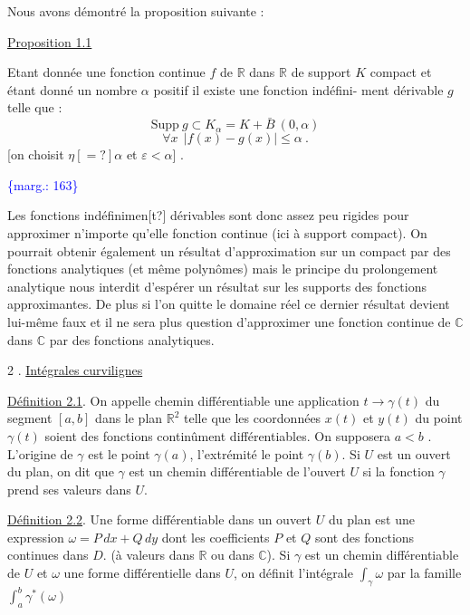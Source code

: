 \documentclass[11pt]{article}
\newcommand{\scanpage}[1]{\par\bigskip\noindent{\small\sffamily[scan #1]}\par}
\newcommand{\mspage}[1]{{\small\sffamily[p.\,#1]}}
\newcommand{\margin}[1]{\textcolor{blue}{\{\textsf{marg.:} #1\}}}
\newcommand{\uline}[1]{\underline{#1}}
\newcommand{\unsure}[1]{[#1?]}
\begin{document}
Nous avons démontré la proposition suivante :

\uline{Proposition 1.1}

Etant donnée une fonction continue $f$ de $\mathbb{R}$ dans $\mathbb{R}$ de support $K$
compact et étant donné un nombre $\alpha$ positif il existe une fonction indéfini-%
ment dérivable $g$ telle que :
\[ \mathrm{Supp}\ g \subset K_\alpha = K + \bar{B}\ (0,\alpha) \]
\[ \forall x\ \ |f(x) - g(x)| \leq \alpha\ . \]
[on choisit $\eta \unsure{=} \alpha$ et $\varepsilon < \alpha$] .

\margin{163}

\clearpage
\scanpage{119/164}
\mspage{- 3 -}

Les fonctions indéfinimen\unsure{t} dérivables sont donc assez peu rigides
pour approximer n'importe qu'elle fonction continue (ici à support compact).
On pourrait obtenir également un résultat d'approximation sur un compact par
des fonctions analytiques (et même polynômes) mais le principe du prolongement
analytique nous interdit d'espérer un résultat sur les supports des fonctions
approximantes.
De plus si l'on quitte le domaine réel ce dernier résultat devient lui-même
faux et il ne sera plus question d'approximer une fonction continue de $\mathbb{C}$
dans $\mathbb{C}$ par des fonctions analytiques.

2 . \uline{Intégrales curvilignes}

\uline{Définition 2.1}. On appelle chemin différentiable une application $t \to \gamma(t)$
du segment $[a,b]$ dans le plan $\mathbb{R}^2$ telle que les coordonnées $x(t)$ et $y(t)$
du point $\gamma(t)$ soient des fonctions continûment différentiables. On supposera
$a < b$ . L'origine de $\gamma$ est le point $\gamma(a)$, l'extrémité le point $\gamma(b)$.
Si $U$ est un ouvert du plan, on dit que $\gamma$ est un chemin différentiable de
l'ouvert $U$ si la fonction $\gamma$ prend ses valeurs dans $U$.

\uline{Définition 2.2}. Une forme différentiable dans un ouvert $U$ du plan est une
expression $\omega = P\,dx + Q\,dy$ dont les coefficients $P$ et $Q$ sont des fonctions
continues dans $D$. (à valeurs dans $\mathbb{R}$ ou dans $\mathbb{C}$). Si $\gamma$ est un chemin
différentiable de $U$ et $\omega$ une forme différentielle dans $U$, on définit
l'intégrale $\int_\gamma \omega$ par la famille $\int_a^b \gamma^*(\omega)$
\end{document}
